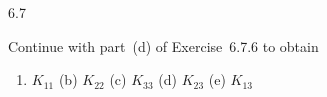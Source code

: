 \begin{exercises}{6.7}
\item Continue with part~(d) of Exercise~6.7.6 to obtain
\begin{enumerate}
\item[(a)] $K_{11}$ \qquad (b) $K_{22}$ \qquad (c) $K_{33}$ \qquad (d) $K_{23}$ \qquad (e) $K_{13}$
\end{enumerate}
\end{exercises}
